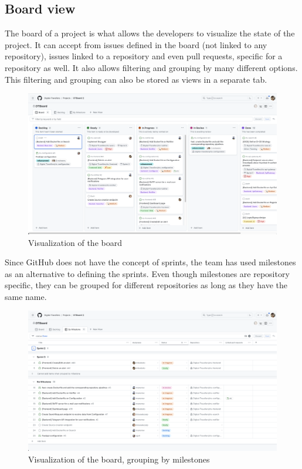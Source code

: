 \documentclass[../memory.tex]{subfiles}
\begin{document}
\subsection{Board view}
The board of a project is what allows the developers to visualize the state of
the project. It can accept from issues defined in the board (not linked to any
repository), issues linked to a repository and even pull requests, specific for
a repository as well. It also allows filtering and grouping by many different
options. This filtering and grouping can also be stored as views in a separate
tab.
\begin{figure}[H]
	\centering
	\includegraphics[width=\textwidth]{./assets/gh-board.png}
	\caption{Visualization of the board}
\end{figure}
Since GitHub does not have the concept of sprints, the team has used milestones
as an alternative to defining the sprints. Even though milestones are repository
specific, they can be grouped for different repositories as long as they have
the same name.
\begin{figure}[H]
	\centering
	\includegraphics[width=\textwidth]{./assets/gh-board-milestone.png}
	\caption{Visualization of the board, grouping by milestones}
\end{figure}
\end{document}
